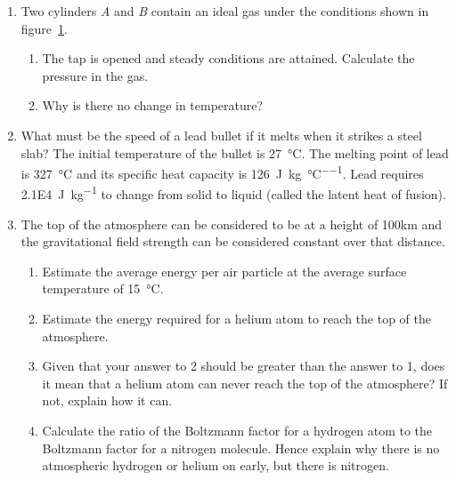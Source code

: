 \documentclass{article}
\begin{document}
\begin{enumerate}
    \newpage
    \item Two cylinders \emph{A} and \emph{B} contain an ideal gas under the conditions shown in figure~\ref{fig:boxes}.        \begin{figure}[h]
            \centering
            \caption{}
            \label{fig:boxes}
        \end{figure}
        \begin{enumerate}
            \item The tap is opened and steady conditions are attained. Calculate the pressure in the gas.
            \item Why is there no change in temperature?
        \end{enumerate}

    \item What must be the speed of a lead bullet if it melts when it strikes a steel slab? The initial temperature of the bullet is \SI{27}{\celsius}. The melting point of lead is \SI{327}{\celsius} and its specific heat capacity is \SI{126}{\joule\per\kg\per\celsius}. Lead requires \SI{2.1E4}{\joule\per\kg} to change from solid to liquid (called the latent heat of fusion).
    
    \item The top of the atmosphere can be considered to be at a height of 100km and the gravitational field strength can be considered constant over that distance. 
        \begin{enumerate}
            \item Estimate the average energy per air particle at the average surface temperature of \SI{15}{\celsius}.
            \item Estimate the energy required for a helium atom to reach the top of the atmosphere.
            \item Given that your answer to 2 should be greater than the answer to 1, does it mean that a helium atom can never reach the top of the atmosphere? If not, explain how it can.
            \item Calculate the ratio of the Boltzmann factor for a hydrogen atom to the Boltzmann factor for a nitrogen molecule. Hence explain why there is no atmospheric hydrogen or helium on early, but there is nitrogen.
        \end{enumerate}

\end{enumerate}
\end{document}
